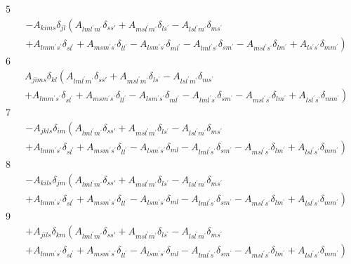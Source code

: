 \documentclass[aps,preprint]{revtex4}%
\begin{document}
5%
\begin{align}
&  -A_{kims}\delta_{jl}\left(  A_{lml^{\prime}m^{\prime}}\delta_{ss\prime
}+A_{msl^{\prime}m^{\prime}}\delta_{ls^{\prime}}-A_{lsl^{\prime}m^{\prime}%
}\delta_{ms^{\prime}}\right. \\
&  \left.  +A_{lmm^{\prime}s^{\prime}}\delta_{sl^{\prime}}+A_{msm^{\prime
}s^{\prime}}\delta_{ll^{\prime}}-A_{lsm^{\prime}s^{\prime}}\delta_{ml^{\prime
}}-A_{lml^{\prime}s^{\prime}}\delta_{sm^{\prime}}-A_{msl^{\prime}s^{\prime}%
}\delta_{lm^{\prime}}+A_{ls^{\prime}s^{\prime}}\delta_{mm^{\prime}}\right)
\end{align}
6%
\begin{align}
&  A_{jims}\delta_{kl}\left(  A_{lml^{\prime}m^{\prime}}\delta_{ss\prime
}+A_{msl^{\prime}m^{\prime}}\delta_{ls^{\prime}}-A_{lsl^{\prime}m^{\prime}%
}\delta_{ms^{\prime}}\right. \\
&  \left.  +A_{lmm^{\prime}s^{\prime}}\delta_{sl^{\prime}}+A_{msm^{\prime
}s^{\prime}}\delta_{ll^{\prime}}-A_{lsm^{\prime}s^{\prime}}\delta_{ml^{\prime
}}-A_{lml^{\prime}s^{\prime}}\delta_{sm^{\prime}}-A_{msl^{\prime}s^{\prime}%
}\delta_{lm^{\prime}}+A_{lsl^{\prime}s^{\prime}}\delta_{mm^{\prime}}\right)
\end{align}
7%
\begin{align}
&  -A_{jkls}\delta_{im}\left(  A_{lml^{\prime}m^{\prime}}\delta_{ss\prime
}+A_{msl^{\prime}m^{\prime}}\delta_{ls^{\prime}}-A_{lsl^{\prime}m^{\prime}%
}\delta_{ms^{\prime}}\right. \\
&  \left.  +A_{lmm^{\prime}s^{\prime}}\delta_{sl^{\prime}}+A_{msm^{\prime
}s^{\prime}}\delta_{ll^{\prime}}-A_{lsm^{\prime}s^{\prime}}\delta
_{ml}-A_{lml^{\prime}s^{\prime}}\delta_{sm^{\prime}}-A_{msl^{\prime}s^{\prime
}}\delta_{lm^{\prime}}+A_{lsl^{\prime}s^{\prime}}\delta_{mm^{\prime}}\right)
\end{align}
8%
\begin{align}
&  -A_{kils}\delta_{jm}\left(  A_{lml^{\prime}m^{\prime}}\delta_{ss\prime
}+A_{msl^{\prime}m^{\prime}}\delta_{ls^{\prime}}-A_{lsl^{\prime}m^{\prime}%
}\delta_{ms^{\prime}}\right. \\
&  \left.  +A_{lmm^{\prime}s^{\prime}}\delta_{sl^{\prime}}+A_{msm^{\prime
}s^{\prime}}\delta_{ll^{\prime}}-A_{lsm^{\prime}s^{\prime}}\delta
_{ml}-A_{lml^{\prime}s^{\prime}}\delta_{sm^{\prime}}-A_{msl^{\prime}s^{\prime
}}\delta_{lm^{\prime}}+A_{lsl^{\prime}s^{\prime}}\delta_{mm^{\prime}}\right)
\end{align}
9%
\begin{align}
&  +A_{jils}\delta_{km}\left(  A_{lml^{\prime}m^{\prime}}\delta_{ss\prime
}+A_{msl^{\prime}m^{\prime}}\delta_{ls^{\prime}}-A_{lsl^{\prime}m^{\prime}%
}\delta_{ms^{\prime}}\right. \\
&  \left.  +A_{lmm^{\prime}s^{\prime}}\delta_{sl^{\prime}}+A_{msm^{\prime
}s^{\prime}}\delta_{ll^{\prime}}-A_{lsm^{\prime}s^{\prime}}\delta
_{ml}-A_{lml^{\prime}s^{\prime}}\delta_{sm^{\prime}}-A_{msl^{\prime}s^{\prime
}}\delta_{lm^{\prime}}+A_{lsl^{\prime}s^{\prime}}\delta_{mm^{\prime}}\right)
\end{align}
\end{document}
